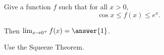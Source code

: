 \documentclass{ximera}
\author{Nela Lakos \and Kyle Parsons}
\begin{document}
\begin{exercise}

Give a function $f$ such that for all $x>0$, 
\[
\cos x \leq f(x) \leq e^x.
\]

Then $\lim_{x\to0^+}f(x) = \answer{1}$.

\begin{hint}
Use the Squeeze Theorem.
\end{hint}

\end{exercise}
\end{document}
